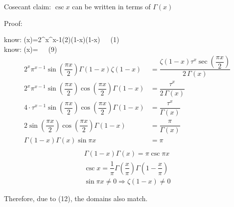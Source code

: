 \documentclass[12pt]{article}
\begin{document}
\pagebreak\begin{section}{Cosecant}
	claim: $\csc x$ can be written in terms of $\Gamma(x)$

	\noindent Proof:

	\noindent know: \zeta(x)=2^x\pi^{x-1}\sin\left(2\right)\Gamma(1-x)\zeta(1-x)~~~(1)\\
	
	\noindent know: \zeta(x)=~~~(9)\\

	\begin{align*}
		2^x\pi^{x-1}\sin\left(\dfrac{\pi x}2\right)\Gamma(1-x)\zeta(1-x) & =\dfrac{\zeta(1-x)\tau^x\sec\left(\dfrac{\pi x}2\right)}{2\,\Gamma(x)}\\
		2^x\pi^{x-1}\sin\left(\dfrac{\pi x}2\right)\cos\left(\dfrac{\pi x}2\right)\Gamma(1-x) & =\dfrac{\tau^x}{2\,\Gamma(x)}\\
		4\cdot\tau^{x-1}\sin\left(\dfrac{\pi x}2\right)\cos\left(\dfrac{\pi x}2\right)\Gamma(1-x) & =\dfrac{\tau^x}{\Gamma(x)}\\
		2\sin\left(\dfrac{\pi x}2\right)\cos\left(\dfrac{\pi x}2\right)\Gamma(1-x) & =\dfrac{\pi}{\Gamma(x)}\\
		\Gamma(1-x)\Gamma(x)\sin\pi x & =\pi\\
	\end{align*}
	\begin{align} %
		\Gamma(1-x)\Gamma(x)=\pi\csc\pi x\\
		\csc x=\dfrac1\pi\Gamma\left(\dfrac x\pi\right)\Gamma\left(1-\dfrac x\pi\right)\\
		\sin\pi x\ne0\Longrightarrow\zeta(1-x)\ne0
	\end{align}

	\noindent\centerline{Therefore, due to (12), the domains also match.}

	\noindent\blacksquare
\end{section}
\end{document}
